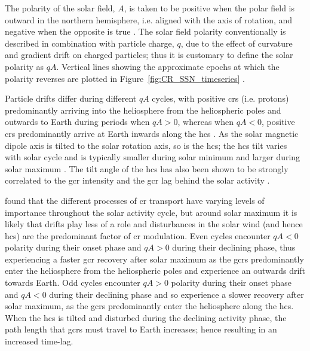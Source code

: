 The polarity of the solar field, $A$, is taken to be positive when the polar field is outward in the northern hemisphere, i.e. aligned with the axis of rotation, and negative when the opposite is true \citep{thomas_22-year_2014}. The solar field polarity conventionally is described in combination with particle charge, $q$, due to the effect of curvature and gradient drift on charged particles; thus it is customary to define the solar polarity as $qA$. Vertical lines showing the approximate epochs at which the polarity reverses are plotted in Figure~\ref{fig:CR_SSN_timeseries} \citep{janardhan_solar_2018, thomas_22-year_2014}. 

Particle drifts differ during different $qA$ cycles, with positive \glspl{cr} (i.e. protons) predominantly arriving into the heliosphere from the heliospheric poles and outwards to Earth during periods when $qA > 0$, whereas when $qA< 0$, positive \glspl{cr} predominantly arrive at Earth inwards along the \gls{hcs} \citep{belov_large_2000, thomas_galactic_2014}. As the solar magnetic dipole axis is tilted to the solar rotation axis, so is the \gls{hcs}; the \gls{hcs} tilt varies with solar cycle and is typically smaller during solar minimum and larger during solar maximum \citep{owens_heliospheric_2013}. The tilt angle of the \gls{hcs} has also been shown to be strongly correlated to the \gls{gcr} intensity and the \gls{gcr} lag behind the solar activity \citep{belov_large_2000, mavromichalaki_cosmic-ray_2007}. 

\cite{aslam_solar_2012, aslam_study_2015} found that the different processes of \gls{cr} transport have varying levels of importance throughout the solar activity cycle, but around solar maximum it is likely that drifts play less of a role and disturbances in the solar wind (and hence \gls{hcs}) are the predominant factor of \gls{cr} modulation. Even cycles encounter $qA<0$ polarity during their onset phase and $qA>0$ during their declining phase, thus experiencing a faster \gls{gcr} recovery after solar maximum as the \glspl{gcr} predominantly enter the heliosphere from the heliospheric poles and experience an outwards drift towards Earth. Odd cycles encounter $qA>0$ polarity during their onset phase and $qA<0$ during their declining phase and so experience a slower recovery after solar maximum, as the \glspl{gcr} predominantly enter the heliosphere along the \gls{hcs}. When the \gls{hcs} is tilted and disturbed during the declining activity phase, the path length that \glspl{gcr} must travel to Earth increases; hence resulting in an increased time-lag.

